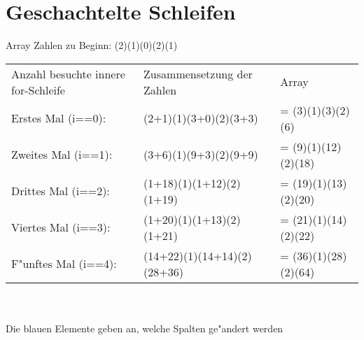 \documentclass[a4paper,11pt,titlepage]{article}
\begin{document}
\section{Geschachtelte Schleifen}
Array Zahlen zu Beginn: (2)(1)(0)(2)(1)\\
\begin{tabular}{lll}
Anzahl besuchte innere for-Schleife&Zusammensetzung der Zahlen&Array\\
Erstes Mal (i==0):& (\textcolor{hellblau}{2+1})(1)(\textcolor{hellblau}{3+0})(2)(\textcolor{hellblau}{3+3})&= (3)(1)(3)(2)(6)\\
Zweites Mal (i==1):& (\textcolor{hellblau}{3+6})(1)(\textcolor{hellblau}{9+3})(2)(\textcolor{hellblau}{9+9})&= (9)(1)(12)(2)(18)\\
Drittes Mal (i==2):&(\textcolor{hellblau}{1+18})(1)(\textcolor{hellblau}{1+12})(2)(\textcolor{hellblau}{1+19})&= (19)(1)(13)(2)(20)\\
Viertes Mal (i==3):&(\textcolor{hellblau}{1+20})(1)(\textcolor{hellblau}{1+13})(2)(\textcolor{hellblau}{1+21})&= (21)(1)(14)(2)(22)\\
F"unftes Mal (i==4):&(\textcolor{hellblau}{14+22})(1)(\textcolor{hellblau}{14+14})(2)(\textcolor{hellblau}{28+36})&= (36)(1)(28)(2)(64)
\end{tabular}
\\
\\
Die blauen Elemente geben an, welche Spalten ge"andert werden\\

\end{document}
